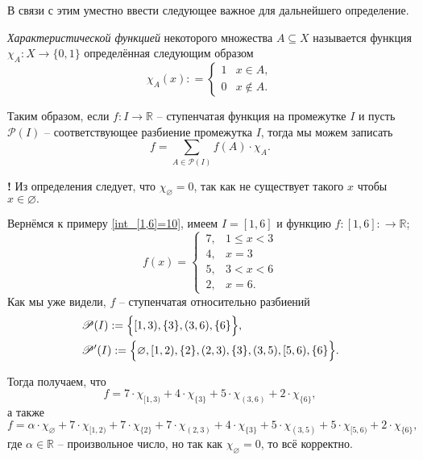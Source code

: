 В связи с этим уместно ввести следующее важное для дальнейшего определение.

\begin{definition}
    \textit{Характеристической функцией} некоторого множества $A \subseteq X$ называется функция $\chi_A: X\to \{0,1\}$ определённая следующим образом
    \[
     \chi_A(x): = \begin{cases}
         1 & x \in A, \\
         0 & x \notin A.
     \end{cases}
    \]
\end{definition}

\begin{remark}
 Таким образом, если $f: I \to \mathbb{R}$ -- ступенчатая функция на промежутке $I$ и пусть $\mathscr{P}(I)$ -- соответствующее разбиение промежутка $I$, тогда мы можем записать
 \[
  f =\sum_{A \in \mathscr{P}(I)} f(A) \cdot \chi_A.
 \]
\end{remark}

\begin{mydanger}{\bf !}
    Из определения следует, что $\chi_{\varnothing} = 0$, так как не существует такого $x$ чтобы $x \in \varnothing.$
\end{mydanger}



\begin{example}

Вернёмся к примеру \ref{int_[1,6]=10}, имеем $I = [1,6]$ и функцию $f: [1,6]: \to \mathbb{R}$;
    \[
     f(x) = \begin{cases}
         \,7, & 1 \le x < 3 \\
         \,4, & x = 3 \\
         \,5, & 3 < x <6 \\
         \,2, & x = 6.
     \end{cases}
    \]
Как мы уже видели, $f$ -- ступенчатая относительно разбиений
\begin{align*}
    &  \mathscr{P}(I) := \Bigl\{[1,3), \{3\}, (3,6), \{6\} \Bigr\},\\
    &  \mathscr{P}'(I) : = \Bigl\{\varnothing, [1,2), \{2\}, (2,3), \{3\}, (3,5), [5,6),\{6\} \Bigr\}.
\end{align*}

Тогда получаем, что
\[
 f = 7 \cdot \chi_{[1,3)} + 4 \cdot \chi_{\{3\}} + 5 \cdot \chi_{(3,6)} + 2 \cdot \chi_{\{6\}},  
\]
а также
\[
f = \alpha \cdot \chi_{\varnothing} + 7 \cdot \chi_{[1,2)} + 7 \cdot \chi_{\{2\}} + 7 \cdot \chi_{(2,3)} + 4 \cdot \chi_{\{3\}} + 5 \cdot \chi_{(3,5)} + 5 \cdot \chi_{[5,6)} + 2 \cdot \chi_{\{6\}},
\]
где $\alpha \in \mathbb{R}$ -- произвольное число, но так как $\chi_\varnothing = 0$, то всё корректно.
\end{example}

